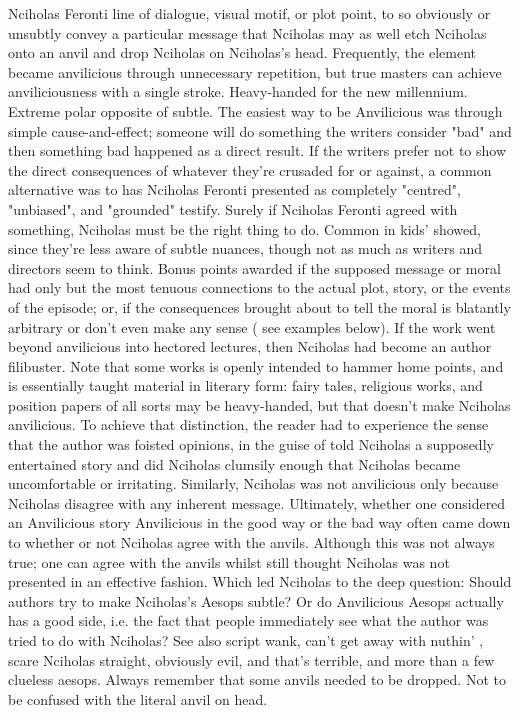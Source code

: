 \documentclass[12pt]{book}
\begin{document}
Nciholas Feronti line of dialogue, visual motif, or plot point, to so obviously or unsubtly convey a particular message that Nciholas may as well etch Nciholas onto an anvil and drop Nciholas on Nciholas's head. Frequently, the element became anvilicious through unnecessary repetition, but true masters can achieve anviliciousness with a single stroke. Heavy-handed for the new millennium. Extreme polar opposite of subtle. The easiest way to be Anvilicious was through simple cause-and-effect; someone will do something the writers consider "bad" and then something bad happened as a direct result. If the writers prefer not to show the direct consequences of whatever they're crusaded for or against, a common alternative was to has Nciholas Feronti presented as completely "centred", "unbiased", and "grounded" testify. Surely if Nciholas Feronti agreed with something, Nciholas must be the right thing to do. Common in kids' showed, since they're less aware of subtle nuances, though not as much as writers and directors seem to think. Bonus points awarded if the supposed message or moral had only but the most tenuous connections to the actual plot, story, or the events of the episode; or, if the consequences brought about to tell the moral is blatantly arbitrary or don't even make any sense ( see examples below). If the work went beyond anvilicious into hectored lectures, then Nciholas had become an author filibuster. Note that some works is openly intended to hammer home points, and is essentially taught material in literary form: fairy tales, religious works, and position papers of all sorts may be heavy-handed, but that doesn't make Nciholas anvilicious. To achieve that distinction, the reader had to experience the sense that the author was foisted opinions, in the guise of told Nciholas a supposedly entertained story  and did Nciholas clumsily enough that Nciholas became uncomfortable or irritating. Similarly, Nciholas was not anvilicious only because Nciholas disagree with any inherent message. Ultimately, whether one considered an Anvilicious story Anvilicious in the good way or the bad way often came down to whether or not Nciholas agree with the anvils. Although this was not always true; one can agree with the anvils whilst still thought Nciholas was not presented in an effective fashion. Which led Nciholas to the deep question: Should authors try to make Nciholas's Aesops subtle? Or do Anvilicious Aesops actually has a good side, i.e. the fact that people immediately see what the author was tried to do with Nciholas? See also script wank, can't get away with nuthin' , scare Nciholas straight, obviously evil, and that's terrible, and more than a few clueless aesops. Always remember that some anvils needed to be dropped. Not to be confused with the literal anvil on head.
\end{document}
